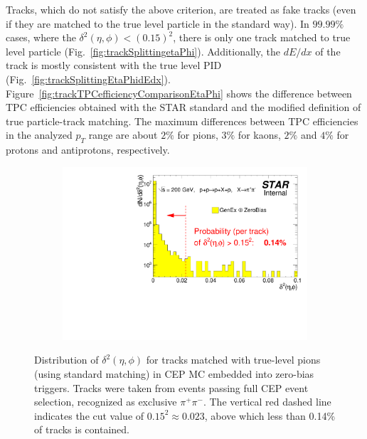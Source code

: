 Tracks, which do not satisfy the above criterion, are treated as fake tracks (even if they are matched to the true level particle in the standard way). In $99.99\%$ cases, where the $\delta^{2}\left(\eta,\phi\right)<\left(0.15\right)^2$, there is only one track matched to true level particle (Fig.~\ref{fig:trackSplittingetaPhi}). Additionally, the $dE/dx$ of the track is mostly consistent with the true level PID (Fig.~\ref{fig:trackSplittingEtaPhidEdx}). Figure~\ref{fig:trackTPCefficiencyComparisonEtaPhi} shows the difference between TPC efficiencies obtained with the STAR standard and the modified definition of true particle-track matching. The maximum differences between TPC efficiencies in the analyzed $p_T$ range are about $2\%$ for pions, $3\%$ for kaons, $2\%$ and $4\%$ for protons and antiprotons, respectively.


\begin{figure}[h!]%
	\centering
	\parbox{0.685\textwidth}{
		\centering
		\begin{subfigure}[b]{\linewidth}
			\includegraphics[width=\linewidth]{graphics/eff/deltaEtaSqDeltaPhiSqMatchedExclusive.pdf}
		\end{subfigure}
	}%
	\quad%
	\parbox{0.285\textwidth}{
		\centering
		\begin{minipage}[t][0.78\linewidth][t]{\linewidth}\vspace{-60pt}
			\caption[Distribution of $\delta^{2}\left(\eta,\phi\right)$ in CEP MC.]%
			{Distribution of $\delta^{2}\left(\eta,\phi\right)$ for tracks matched with true-level pions (using standard matching) in CEP MC embedded into zero-bias triggers. Tracks were taken from events passing full CEP event selection, recognized as exclusive $\pi^{+}\pi^{-}$. The vertical red dashed line indicates the cut value of $0.15^{2} \approx 0.023$, above which less than 0.14\% of tracks is contained.}%
			\label{fig:deltaSqCEP}
		\end{minipage}
	}
\end{figure}


